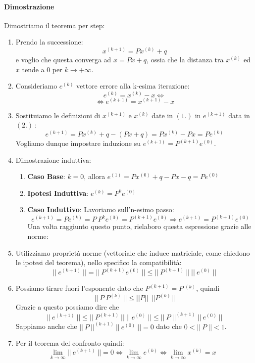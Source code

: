 \documentclass{article}
\begin{document}
\paragraph{Dimostrazione} Dimostriamo il teorema per step:

\begin{enumerate}
    \item Prendo la successione:
    \[ x^{(k+1)} = Px^{(k)} + q \]
    e voglio che questa converga ad $x=Px+q$, ossia che la distanza tra $x^{(k)}$ ed $x$ tende a $0$ per $k \rightarrow +\infty$.
    \vspace*{15px}
    \item Consideriamo $e^{(k)}$ vettore errore alla k-esima iterazione:
    \[ e^{(k)} = x^{(k)} - x  \Leftrightarrow \]
    \[ \Leftrightarrow e^{(k+1)} = x^{(k+1)} - x \]
    \vspace*{15px}
    \item Sostituiamo le definizioni di $x^{(k+1)}$ e $x^{(k)}$ date in $(1.)$ in $e^{(k+1)}$ data in $(2.)\:$:
    \[ e^{(k+1)} = Px^{(k)} + q - (Px+q) = Px^{(k)} - Px = Pe^{(k)} \]
    \vspace*{15px}
    Vogliamo dunque impostare induzione su $\boxed{e^{(k+1)} = P^{(k+1)}e^{(0)}}$.
    \newpage
    \item Dimostrazione induttiva:
    \begin{enumerate}
        \item \textbf{Caso Base}: $k=0$, allora $e^{(1)} = Px^{(0)} + q - Px - q = Pe^{(0)}$ 
        \item \textbf{Ipotesi Induttiva}: $ \boxed{e^{(k)} = P^{k}e^{(0)}} $
        \item \textbf{Caso Induttivo}: Lavoriamo sull'n-esimo passo:
        \[ e^{(k+1)} = Pe^{(k)} = P \: P^{k} e^{(0)} = P^{(k+1)} e^{(0)} \Rightarrow e^{(k+1)} = P^{(k+1)}e^{(0)} \]
        Una volta raggiunto questo punto, rielaboro questa espressione grazie alle norme:
    \end{enumerate}
    \item Utilizziamo proprietà norme (vettoriale che induce matriciale, come chiedono le ipotesi del teorema), nello specifico la compatibilità:
    \[ ||\: e^{(k+1)} \:|| = ||\: P^{(k+1)} e^{(0)} \:|| \leq ||\: P^{(k+1)} \:|| \: ||\: e^{(0)} \:|| \]
    \item Possiamo tirare fuori l'esponente dato che $P^{(k+1)} = P\:^{(k)} $, quindi 
    \[ ||\: P \: P^{(k)} \:|| \leq ||P|| \:\: ||P^{(k)}|| \]
    Grazie a questo possiamo dire che
    \[ ||\: e^{(k+1)} \:|| \leq ||\: P^{(k+1)} \:|| \: ||\: e^{(0)} \:|| \leq ||\: P \:||^{(k+1)} \: ||\: e^{(0)} \:||\]
    Sappiamo anche che $||\: P \:||^{(k+1)} \: ||\: e^{(0)} \:|| = 0$ dato che $0 < ||\:P\:|| < 1 $.
    \item Per il teorema del confronto quindi:
    \[ \lim_{k \rightarrow \infty} ||\: e^{(k+1)} \:|| = 0 \Longleftrightarrow \lim_{k \rightarrow \infty} e^{(k)} \Longleftrightarrow \lim_{k \rightarrow \infty} x^{(k)} = x \:\:\: \boxed{} \] 
\end{enumerate}
\end{document}
